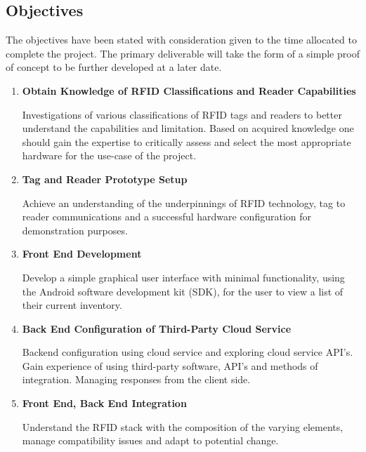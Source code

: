 \documentclass[a4paper, 11pt]{article}
\begin{document}
\subsection{Objectives}
The objectives have been stated with consideration given to the time allocated to complete the project. The primary deliverable will take the form of a simple proof of concept to be further developed at a later date. 

\begin{enumerate}

   \item \textbf{Obtain Knowledge of RFID Classifications and Reader Capabilities}
   	\begin{flushleft}Investigations of various classifications of RFID tags and readers to better understand the capabilities and limitation. Based on acquired knowledge one should gain the expertise to critically assess and select the most appropriate hardware for the use-case of the project.
  	\end{flushleft}
	
   \item \textbf{Tag and Reader Prototype Setup}
   	\begin{flushleft}Achieve an understanding of the underpinnings of RFID technology, tag to reader communications and a successful hardware configuration for demonstration purposes.
  	\end{flushleft}
  
   \item \textbf{Front End Development}
   	\begin{flushleft}Develop a simple graphical user interface with minimal functionality, using the Android software development kit (SDK), for the user to view a list of their current inventory. 		  \end{flushleft}
  
   \item \textbf{Back End Configuration of Third-Party Cloud Service}
   	\begin{flushleft}
	Backend configuration using cloud service and exploring cloud service API's. Gain experience of using third-party software, API's and methods of integration. Managing responses from the client side. 
	 \end{flushleft}
	 
	    \item \textbf{Front End, Back End Integration}
   	\begin{flushleft}Understand the RFID stack with the composition of the varying elements, manage compatibility issues and adapt to potential change.
  	\end{flushleft}
 

\end{enumerate}
\end{document}
